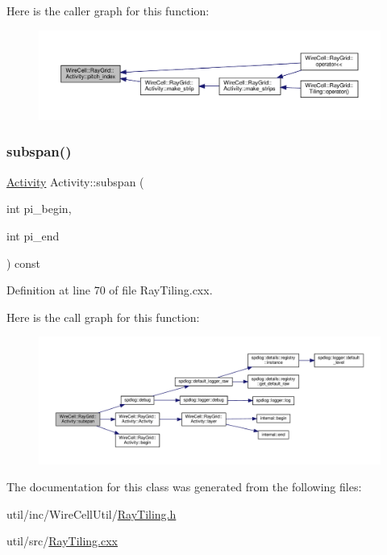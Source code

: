 Here is the caller graph for this function\+:
\nopagebreak
\begin{figure}[H]
\begin{center}
\leavevmode
\includegraphics[width=350pt]{class_wire_cell_1_1_ray_grid_1_1_activity_add0847697b47de9b2e1c6c6d46cc31e7_icgraph}
\end{center}
\end{figure}
\mbox{\label{class_wire_cell_1_1_ray_grid_1_1_activity_a0c8f129658f18402202b7c9605dfe26f}} 
\subsubsection{\texorpdfstring{subspan()}{subspan()}}
{\footnotesize\ttfamily \hyperlink{class_wire_cell_1_1_ray_grid_1_1_activity}{Activity} Activity\+::subspan (\begin{DoxyParamCaption}\item[{int}]{pi\+\_\+begin,  }\item[{int}]{pi\+\_\+end }\end{DoxyParamCaption}) const}



Definition at line 70 of file Ray\+Tiling.\+cxx.

Here is the call graph for this function\+:
\nopagebreak
\begin{figure}[H]
\begin{center}
\leavevmode
\includegraphics[width=350pt]{class_wire_cell_1_1_ray_grid_1_1_activity_a0c8f129658f18402202b7c9605dfe26f_cgraph}
\end{center}
\end{figure}


The documentation for this class was generated from the following files\+:\begin{DoxyCompactItemize}
\item 
util/inc/\+Wire\+Cell\+Util/\hyperlink{_ray_tiling_8h}{Ray\+Tiling.\+h}\item 
util/src/\hyperlink{_ray_tiling_8cxx}{Ray\+Tiling.\+cxx}\end{DoxyCompactItemize}
